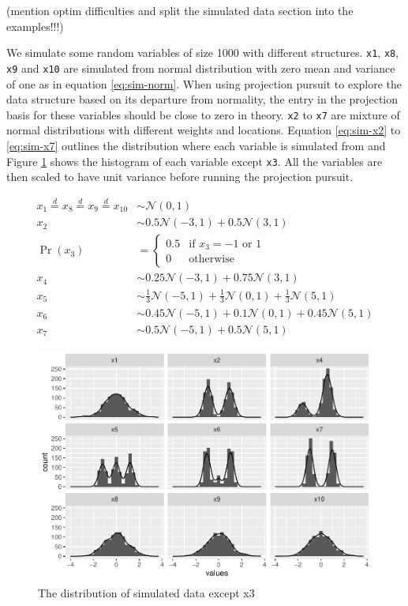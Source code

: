 \documentclass[12pt]{article}
\begin{document}
(mention optim difficulties and split the simulated data section into
the examples!!!)

We simulate some random variables of size 1000 with different
structures. \texttt{x1}, \texttt{x8}, \texttt{x9} and \texttt{x10} are
simulated from normal distribution with zero mean and variance of one as
in equation \ref{eq:sim-norm}. When using projection pursuit to explore
the data structure based on its departure from normality, the entry in
the projection basis for these variables should be close to zero in
theory. \texttt{x2} to \texttt{x7} are mixture of normal distributions
with different weights and locations. Equation \ref{eq:sim-x2} to
\ref{eq:sim-x7} outlines the distribution where each variable is
simulated from and Figure \ref{origin-data} shows the histogram of each
variable except \texttt{x3}. All the variables are then scaled to have
unit variance before running the projection pursuit.

\begin{align}
x_1 \overset{d}{=} x_8 \overset{d}{=} x_9 \overset{d}{=} x_{10}& \sim \mathcal{N}(0, 1) \label{eq:sim-norm} \\
x_2 &\sim 0.5 \mathcal{N}(-3, 1) + 0.5 \mathcal{N}(3, 1)\label{eq:sim-x2}\\
\Pr(x_3) &= 
\begin{cases}
0.5 & \text{if $x_3 = -1$ or $1$}\\
0 & \text{otherwise}
\end{cases}\label{eq:sim-x3}\\
x_4 &\sim 0.25 \mathcal{N}(-3, 1) + 0.75 \mathcal{N}(3, 1) \label{eq:sim-x4}\\
x_5 &\sim \frac{1}{3} \mathcal{N}(-5, 1) + \frac{1}{3} \mathcal{N}(0, 1) + \frac{1}{3} \mathcal{N}(5, 1)\label{eq:sim-x5}\\
x_6 &\sim 0.45 \mathcal{N}(-5, 1) + 0.1 \mathcal{N}(0, 1) + 0.45 \mathcal{N}(5, 1)\label{eq:sim-x6}\\
x_7 &\sim 0.5 \mathcal{N}(-5, 1) + 0.5 \mathcal{N}(5, 1) 
\label{eq:sim-x7}
\end{align}

\begin{figure}
\centering
\includegraphics{paper_files/figure-latex/origin-data-1.pdf}
\caption{\label{origin-data} The distribution of simulated data except
x3}
\end{figure}
\end{document}
